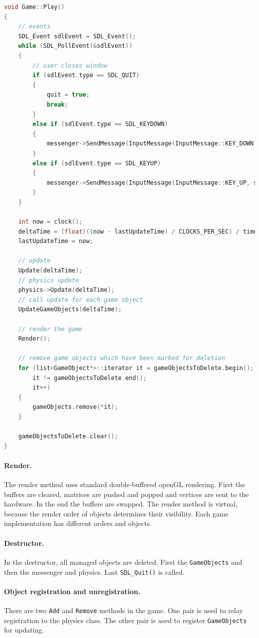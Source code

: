 \documentclass[12pt]{article}
\begin{document}
\begin{lstlisting}[caption=The play method.,language=C++]
void Game::Play()
{
	// events
	SDL_Event sdlEvent = SDL_Event();
	while (SDL_PollEvent(&sdlEvent))
	{
		// user closes window
		if (sdlEvent.type == SDL_QUIT)
		{
			quit = true;
			break;
		}
		else if (sdlEvent.type == SDL_KEYDOWN)
		{
			messenger->SendMessage(InputMessage(InputMessage::KEY_DOWN, sdlEvent.key.keysym.sym));
		}
		else if (sdlEvent.type == SDL_KEYUP)
		{
			messenger->SendMessage(InputMessage(InputMessage::KEY_UP, sdlEvent.key.keysym.sym));
		}
	}

	int now = clock();
	deltaTime = (float)((now - lastUpdateTime) / CLOCKS_PER_SEC) / timeScale;
	lastUpdateTime = now;

	// update
	Update(deltaTime);
	// physics update
	physics->Update(deltaTime);
	// call update for each game object
	UpdateGameObjects(deltaTime);

	// render the game
	Render();

	// remove game objects which have been marked for deletion
	for (list<GameObject*>::iterator it = gameObjectsToDelete.begin();
		it != gameObjectsToDelete.end();
		it++)
	{
		gameObjects.remove(*it);
	}

	gameObjectsToDelete.clear();
}
\end{lstlisting}

\paragraph{Render.} The render method uses standard double-buffered openGL rendering. First the buffers are cleared, matrices are pushed and popped and vertices are sent to the hardware. In the end the buffers are swapped. The render method is virtual, because the render order of objects determines their visibility. Each game implementation has different orders and objects.

\paragraph{Destructor.} In the destructor, all managed objects are deleted. First the \texttt{GameObjects} and then the messenger and physics. Last \texttt{SDL\_Quit()} is called.

\paragraph{Object registration and unregistration.} There are two \texttt{Add} and \texttt{Remove} methods in the game. One pair is used to relay registration to the physics class. The other pair is used to register \texttt{GameObjects} for updating.
\end{document}

